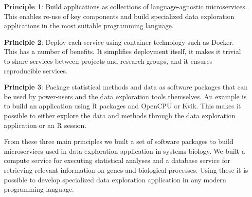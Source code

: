 \textbf{Principle 1}: Build applications as collections of language-agnostic
microservices. 
This enables re-use of key components and build
specialized data exploration applications in the most suitable programming
language. 

\textbf{Principle 2}: Deploy each service using container technology such as
Docker. This has a number of benefits. It simplifies deployment itself, it makes
it trivial to share services between projects and research groups, and it
ensures reproducible services.

\textbf{Principle 3}: Package statistical methods and data as software packages
that can be used by power-users and the data exploration tools themselves. 
An
example is to build an application using R packages and OpenCPU or Kvik. This
makes it possible to either explore the data and methods through the data
exploration application or an R session. 


From these three main principles we built a set of software packages to build
microservices used in data exploration application in systems biology.
We built
a compute service for executing statistical analyses and a database service for
retrieving relevant information on genes and biological processes.  
Using these
it is possible to develop specialized data exploration application in any modern
programming language.  


